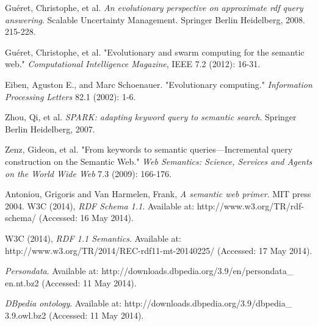 \documentclass[thesis,12pt]{article}
\begin{document}
\begin{thebibliography}{9}

Guéret, Christophe, et al. 
\emph{An evolutionary perspective on approximate rdf query answering}.   
 Scalable Uncertainty Management. Springer Berlin Heidelberg, 2008. 215-228.

Guéret, Christophe, et al. "Evolutionary and swarm computing for the semantic web." \emph{Computational Intelligence Magazine}, IEEE 7.2 (2012): 16-31.

Eiben, Aguston E., and Marc Schoenauer. "Evolutionary computing." 
\emph{Information Processing Letters} 82.1 (2002): 1-6.

Zhou, Qi, et al. \emph{SPARK: adapting keyword query to semantic search}. Springer Berlin Heidelberg, 2007.

Zenz, Gideon, et al. "From keywords to semantic queries—Incremental query construction on the Semantic Web." \emph{Web Semantics: Science, Services and Agents on the World Wide Web} 7.3 (2009): 166-176.

  Antoniou, Grigoris and Van Harmelen, Frank,
  \emph{A semantic web primer}.
  MIT press
  2004.
 W3C (2014), 
   \emph{RDF Schema 1.1}.
   Available at: http://www.w3.org/TR/rdf-schema/
   (Accessed: 16 May 2014).
   
W3C (2014), 
  \emph{RDF 1.1 Semantics}.
  Available at: http://www.w3.org/TR/2014/REC-rdf11-mt-20140225/
  (Accessed: 17 May 2014).

  \emph{Persondata}.
  Available at: http://downloads.dbpedia.org/3.9/en/persondata\_ en.nt.bz2
  (Accessed: 11 May 2014).

  \emph{DBpedia ontology}.
  Available at: http://downloads.dbpedia.org/3.9/dbpedia\_ 3.9.owl.bz2
  (Accessed: 11 May 2014).
  
\end{thebibliography}
\end{document}
